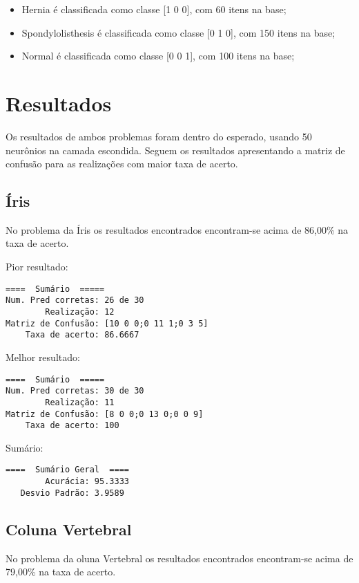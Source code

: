 \begin{itemize}
\tightlist
\item
  Hernia é classificada como classe {[}1 0 0{]}, com 60 itens na base;
\item
  Spondylolisthesis é classificada como classe {[}0 1 0{]}, com 150
  itens na base;
\item
  Normal é classificada como classe {[}0 0 1{]}, com 100 itens na base;
\end{itemize}

\section{Resultados}

Os resultados de ambos problemas foram dentro do esperado, usando 50
neurônios na camada escondida. Seguem os resultados apresentando a
matriz de confusão para as realizações com maior taxa de acerto.

\subsection{Íris}

No problema da Íris os resultados encontrados encontram-se acima de
86,00\% na taxa de acerto.

Pior resultado:

\begin{verbatim}
====  Sumário  =====
Num. Pred corretas: 26 de 30
        Realização: 12
Matriz de Confusão: [10 0 0;0 11 1;0 3 5]
    Taxa de acerto: 86.6667
\end{verbatim}

Melhor resultado:

\begin{verbatim}
====  Sumário  =====
Num. Pred corretas: 30 de 30
        Realização: 11
Matriz de Confusão: [8 0 0;0 13 0;0 0 9]
    Taxa de acerto: 100
\end{verbatim}

Sumário:

\begin{verbatim}
====  Sumário Geral  ====
        Acurácia: 95.3333
   Desvio Padrão: 3.9589
\end{verbatim}

\subsection{Coluna Vertebral}

No problema da oluna Vertebral os resultados encontrados encontram-se
acima de 79,00\% na taxa de acerto.

